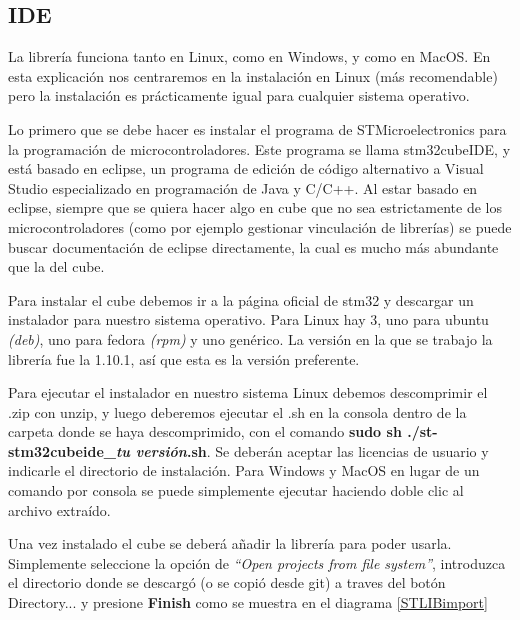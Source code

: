 \documentclass{report}
\begin{document}
\subsection{IDE}


\par
La librería funciona tanto en Linux, como en Windows, y como en MacOS. En esta explicación nos centraremos en la instalación en Linux (más recomendable) pero la instalación es prácticamente igual para cualquier sistema operativo.
\par \vspace{0.3 cm}
Lo primero que se debe hacer es instalar el programa de STMicroelectronics para la programación de microcontroladores. Este programa se llama stm32cubeIDE, y está basado en eclipse, un programa de edición de código alternativo a Visual Studio especializado en programación de Java y C/C++. Al estar basado en eclipse, siempre que se quiera hacer algo en cube que no sea estrictamente de los microcontroladores (como por ejemplo gestionar vinculación de librerías) se puede buscar documentación de eclipse directamente, la cual es mucho más abundante que la del cube. \par
Para instalar el cube debemos ir a la página oficial de stm32 \cite{web:STM32:installationCube} y descargar un instalador para nuestro sistema operativo. Para Linux hay 3, uno para ubuntu \textit{(deb)}, uno para fedora \textit{(rpm)} y uno genérico. La versión en la que se trabajo la librería fue la 1.10.1, así que esta es la versión preferente. \par
Para ejecutar el instalador en nuestro sistema Linux debemos descomprimir el .zip con unzip, y luego deberemos ejecutar el .sh en la consola dentro de la carpeta donde se haya descomprimido, con el comando \textbf{sudo sh ./st-stm32cubeide\_\textit{tu versión}.sh}. Se deberán aceptar las licencias de usuario y indicarle el directorio de instalación. Para Windows y MacOS en lugar de un comando por consola se puede simplemente ejecutar haciendo doble clic al archivo extraído. 
\par \vspace{0.3 cm}

Una vez instalado el cube se deberá añadir la librería para poder usarla. Simplemente seleccione la opción de \textit{``Open projects from file system''}, introduzca el directorio donde se descargó (o se copió desde git) a traves del botón Directory... y presione \textbf{Finish} como se muestra en el diagrama \ref{STLIBimport} \par \vspace{0.3 cm}
\end{document}
